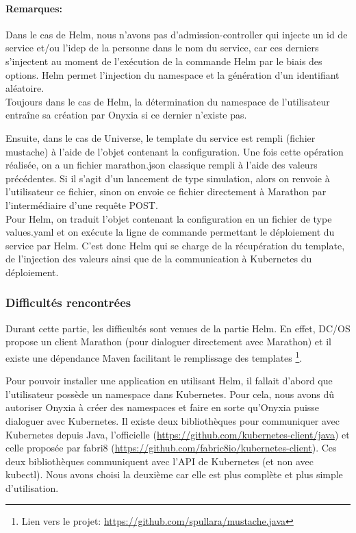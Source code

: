 \documentclass[11pt,fleqn]{book} %
\begin{document}
\vspace{-1cm}
\begin{interrupt}
\paragraph{Remarques:}
 Dans le cas de Helm, nous n'avons pas d'admission-controller qui injecte un id de service et/ou l'idep de la personne dans le nom du service, car ces derniers s'injectent au moment de l'exécution de la commande Helm par le biais des options. Helm permet l'injection du namespace et la génération d'un identifiant aléatoire. \\
 
 Toujours dans le cas de Helm, la détermination du namespace de l'utilisateur entraîne sa création par Onyxia si ce dernier n'existe pas.
\end{interrupt}
Ensuite, dans le cas de Universe, le template du service est rempli (fichier mustache) à l'aide de l'objet contenant la configuration. Une fois cette opération réalisée, on a un fichier marathon.json classique rempli à l'aide des valeurs précédentes. Si il s'agit d'un lancement de type simulation, alors on renvoie à l'utilisateur ce fichier, sinon on envoie ce fichier directement à Marathon par l'intermédiaire d'une requête POST.\\

Pour Helm, on traduit l'objet contenant la configuration en un fichier de type values.yaml et on exécute la ligne de commande permettant le déploiement du service par Helm. C'est donc Helm qui se charge de la récupération du template, de l'injection des valeurs ainsi que de la communication à Kubernetes du déploiement.

\subsubsection{Difficultés rencontrées}
Durant cette partie, les difficultés sont venues de la partie Helm. En effet, DC/OS propose un client Marathon (pour dialoguer directement avec Marathon) et il existe une dépendance Maven facilitant le remplissage des templates \footnote{Lien vers le projet: \url{https://github.com/spullara/mustache.java}}.\newline

Pour pouvoir installer une application en utilisant Helm, il fallait d'abord que l'utilisateur possède un namespace dans Kubernetes. Pour cela, nous avons dû autoriser Onyxia à créer des namespaces et faire en sorte qu'Onyxia puisse dialoguer avec Kubernetes. Il existe deux bibliothèques pour communiquer avec Kubernetes depuis Java, l'officielle (\url{https://github.com/kubernetes-client/java}) et celle proposée par fabri8 (\url{https://github.com/fabric8io/kubernetes-client}). Ces deux bibliothèques communiquent avec l'API de Kubernetes (et non avec kubectl). Nous avons choisi la deuxième car elle est plus complète et plus simple d'utilisation. \newline
\end{document}
